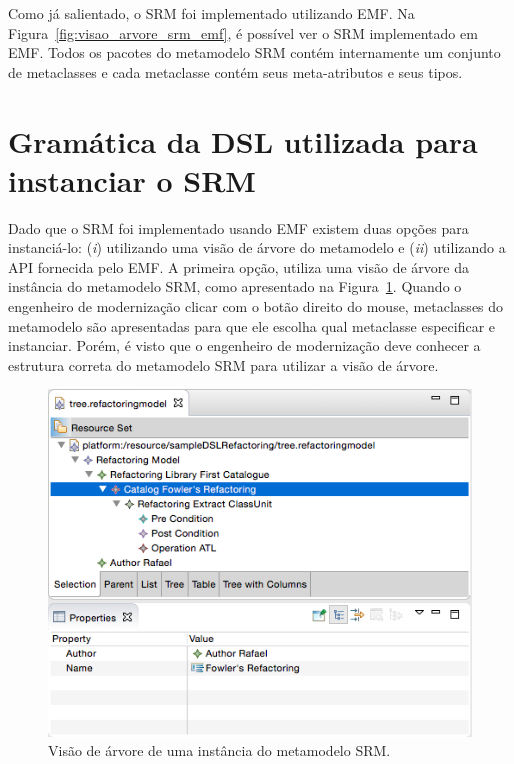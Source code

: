 Como já salientado, o SRM foi implementado utilizando EMF. Na Figura~\ref{fig:visao_arvore_srm_emf}, é possível ver o SRM implementado em EMF. Todos os pacotes do metamodelo SRM contém internamente um conjunto de metaclasses e cada metaclasse contém seus meta-atributos e seus tipos.

\section{Gramática da DSL utilizada para instanciar o SRM}

Dado que o SRM foi implementado usando EMF existem duas opções para instanciá-lo: (\textit{i}) utilizando uma visão de árvore do metamodelo e (\textit{ii}) utilizando a API fornecida pelo EMF. A primeira opção, utiliza uma visão de árvore da instância do metamodelo SRM, como apresentado na Figura~\ref{fig:visao_arvore_metamodelo_srm}. Quando o engenheiro de modernização clicar com o botão direito do mouse, metaclasses do metamodelo são apresentadas para que ele escolha qual metaclasse especificar e instanciar. Porém, é visto que o engenheiro de modernização deve conhecer a estrutura correta do metamodelo SRM para utilizar a visão de árvore. 

\begin{figure}[h]
	\centering
	\caption{Visão de árvore de uma instância do metamodelo SRM.}
	\label{fig:visao_arvore_metamodelo_srm}
	\includegraphics[scale=0.65]{images/tree_srm}
	\fautor
\end{figure}

